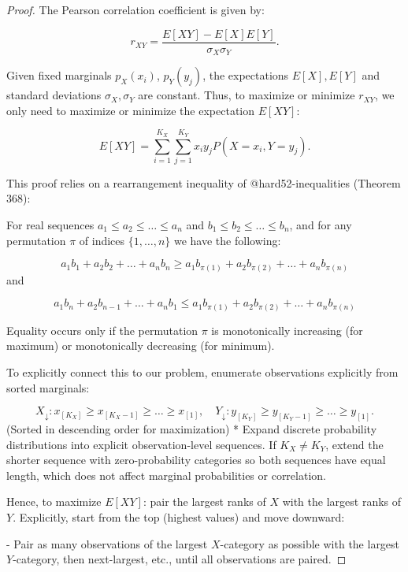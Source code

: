 \documentclass[
  12pt,
]{article}
\begin{document}
\begin{proof}



The Pearson correlation coefficient is given by:

$$r_{XY} = \frac{E[XY] - E[X]E[Y]}{\sigma_X \sigma_Y}.$$

Given fixed marginals $p_X(x_i)$, $p_Y(y_j)$, the expectations $E[X], E[Y]$ and standard deviations $\sigma_X, \sigma_Y$ are constant. Thus, to maximize or minimize $r_{XY}$, we only need to maximize or minimize the expectation $E[XY]$:

$$E[XY] = \sum_{i=1}^{K_X}\sum_{j=1}^{K_Y} x_i y_j P(X = x_i, Y = y_j).$$

This proof relies on a rearrangement inequality of @hard52-inequalities (Theorem 368):

For real sequences $a_1 \leq a_2 \leq \dots \leq a_n$ and $b_1 \leq b_2 \leq \dots \leq b_n$, and for any permutation $\pi$ of indices $\{1,\dots,n\}$ we have the following:

    

$$a_1 b_1 + a_2 b_2 + \dots + a_n b_n \geq a_1 b_{\pi(1)} + a_2 b_{\pi(2)} + \dots + a_n b_{\pi(n)}$$
and
 
    
$$a_1 b_n + a_2 b_{n-1} + \dots + a_n b_1 \leq a_1 b_{\pi(1)} + a_2 b_{\pi(2)} + \dots + a_n b_{\pi(n)}$$

Equality occurs only if the permutation $\pi$ is monotonically increasing (for maximum) or monotonically decreasing (for minimum).



To explicitly connect this to our problem, enumerate observations explicitly from sorted marginals:
    
        $$X_{\downarrow}: x_{[K_X]} \geq x_{[K_X-1]} \geq \dots \geq x_{[1]}, \quad  
        Y_{\downarrow}: y_{[K_Y]} \geq y_{[K_Y-1]} \geq \dots \geq y_{[1]}.$$
(Sorted in descending order for maximization)
* Expand discrete probability distributions into explicit observation-level sequences. 
If $K_X \neq K_Y$, extend the shorter sequence with zero-probability categories so both sequences have equal length, which does not affect marginal probabilities or correlation.

Hence, to maximize $E[XY]$: pair the largest ranks of $X$ with the largest ranks of $Y$. Explicitly, start from the top (highest values) and move downward:
    
- Pair as many observations of the largest $X$-category as possible with the largest $Y$-category, then next-largest, etc., until all observations are paired.
        

\end{proof}
\end{document}
